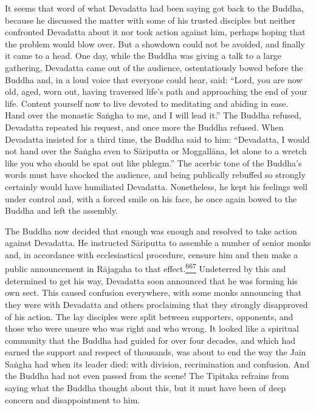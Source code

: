 It seems that word of what Devadatta had been saying got back to the
Buddha, because he discussed the matter with some of his trusted
disciples but neither confronted Devadatta about it nor took action
against him, perhaps hoping that the problem would blow over. But a
showdown could not be avoided, and finally it came to a head. One day,
while the Buddha was giving a talk to a large gathering, Devadatta came
out of the audience, ostentatiously bowed before the Buddha and, in a
loud voice that everyone could hear, said: ``Lord, you are now old,
aged, worn out, having traversed life's path and approaching the end of
your life. Content yourself now to live devoted to meditating and
abiding in ease. Hand over the monastic Saṅgha to me, and I will lead
it.'' The Buddha refused, Devadatta repeated his request, and once more
the Buddha refused. When Devadatta insisted for a third time, the Buddha
said to him: ``Devadatta, I would not hand over the Saṅgha even to
Sāriputta or Moggallāna, let alone to a wretch like you who should be
spat out like phlegm.'' The acerbic tone of the Buddha's words must have
shocked the audience, and being publically rebuffed so strongly
certainly would have humiliated Devadatta. Nonetheless, he kept his
feelings well under control and, with a forced smile on his face, he
once again bowed to the Buddha and left the assembly.

The Buddha now decided that enough was enough and resolved to take
action against Devadatta. He instructed Sāriputta to assemble a number
of senior monks and, in accordance with ecclesiastical procedure,
censure him and then make a public announcement in Rājagaha to that
effect.\label{footprints_split_016.html_fnref667}\hyperref[footprints_split_025.htmlux5cux23fn667]{\textsuperscript{667}}
Undeterred by this and determined to get his way, Devadatta soon
announced that he was forming his own sect. This caused confusion
everywhere, with some monks announcing that they were with Devadatta and
others proclaiming that they strongly disapproved of his action. The lay
disciples were split between supporters, opponents, and those who were
unsure who was right and who wrong. It looked like a spiritual community
that the Buddha had guided for over four decades, and which had earned
the support and respect of thousands, was about to end the way the Jain
Saṅgha had when its leader died: with division, recrimination and
confusion. And the Buddha had not even passed from the scene! The
Tipitaka refrains from saying what the Buddha thought about this, but it
must have been of deep concern and disappointment to him.

